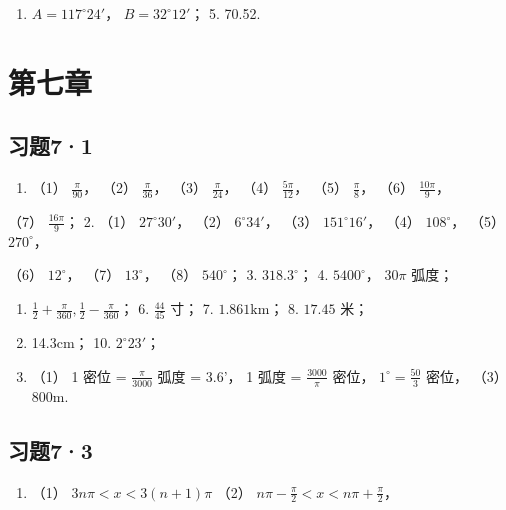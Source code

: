 \begin{enumerate}[start=3]
\item
  \(A = 117^{\circ}24'\)， \(B = 32^{\circ}12'\)； 5. 70.52.
\end{enumerate}

\section{第七章}

\subsection{习题7·1}

\begin{enumerate}
\item
  （1） \(\frac{\pi}{90}\)， （2） \(\frac{\pi}{36}\)， （3）
  \(\frac{\pi}{24}\)， （4） \(\frac{5\pi}{12}\)， （5）
  \(\frac{\pi}{8}\)， （6） \(\frac{10\pi}{9}\)，
\end{enumerate}

（7） \(\frac{16\pi}{9}\)； 2. （1） \(27^{\circ}30'\)， （2）
\(6^{\circ}34'\)， （3） \(151^{\circ}16'\)， （4） \(108^{\circ}\)，
（5） \(270^{\circ}\)，

（6） \(12^{\circ}\)， （7） \(13^{\circ}\)， （8） \(540^{\circ}\)； 3.
\(318.3^{\circ}\)； 4. \(5400^{\circ}\)， \(30\pi\) 弧度；

\begin{enumerate}[start=5]
\item
  \(\frac{1}{2} + \frac{\pi}{360}, \frac{1}{2} - \frac{\pi}{360}\)； 6.
  \(\frac{44}{45}\) 寸； 7. \(1.861\mathrm{km}\)； 8. \(17.45\) 米；
\item
  14.3cm； 10. \(2^{\circ}23'\)；
\item
  （1） 1 密位 = \(\frac{\pi}{3000}\) 弧度 = 3.6'， 1 弧度 =
  \(\frac{3000}{\pi}\) 密位， \(1^{\circ} = \frac{50}{3}\) 密位， （3）
  \(800\mathrm{m}\).
\end{enumerate}

\subsection{习题7·3}

\begin{enumerate}
\item
  （1） \(3n\pi < x < 3(n + 1)\pi\) （2）
  \(n\pi - \frac{\pi}{2} < x < n\pi + \frac{\pi}{2}\)，
\end{enumerate}

